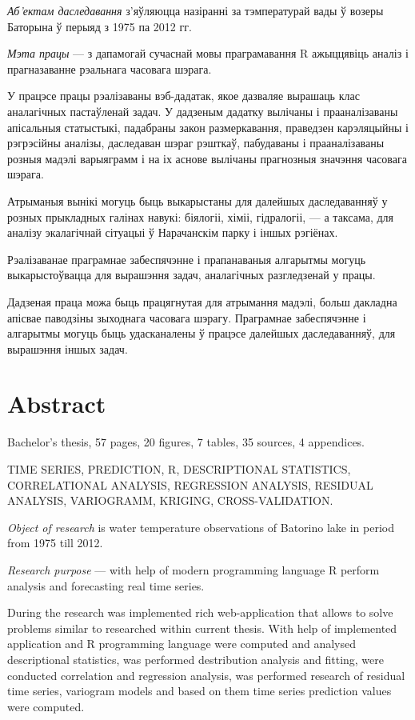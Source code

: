 \textit{Аб'ектам даследавання} з'яўляюцца назіранні за тэмпературай вады ў возеры Баторына ў перыяд з 1975 па 2012 гг.

\textit{Мэта працы} --- з дапамогай сучаснай мовы праграмавання R ажыццявіць аналіз і прагназаванне рэальнага часовага шэрага.

У працэсе працы рэалізаваны вэб-дадатак, якое дазваляе вырашаць клас аналагічных пастаўленай задач. У дадзеным дадатку вылічаны і прааналізаваны апісальныя статыстыкі, падабраны закон размеркавання, праведзен карэляцыйны і рэгрэсійны аналізы, даследаван шэраг рэшткаў, пабудаваны і прааналізаваны розныя мадэлі варыяграмм і на іх аснове вылічаны прагнозныя значэння часовага шэрага.

Атрыманыя вынікі могуць быць выкарыстаны для далейшых даследаванняў у розных прыкладных галінах навукі: біялогіі, хіміі, гідралогіі, --- а таксама, для аналізу экалагічнай сітуацыі ў Нарачанскім парку і іншых рэгіёнах.

Рэалізаванае праграмнае забеспячэнне і прапанаваныя алгарытмы могуць выкарыстоўвацца для вырашэння задач, аналагічных разгледзенай у працы.

Дадзеная праца можа быць працягнутая для атрымання мадэлі, больш дакладна апісвае паводзіны зыходнага часовага шэрагу. Праграмнае забеспячэнне і алгарытмы могуць быць удасканалены ў працэсе далейшых даследаванняў, для вырашэння іншых задач.

\newpage

\chapter*{Abstract}
Bachelor's thesis, 57 pages, 20 figures, 7 tables, 35 sources, 4 appendices.

TIME SERIES, PREDICTION, R, DESCRIPTIONAL STATISTICS, CORRELATIONAL ANALYSIS, REGRESSION ANALYSIS, RESIDUAL ANALYSIS, VARIOGRAMM, KRIGING, CROSS-VALIDATION.

\textit{Object of research} is water temperature observations of Batorino lake in period from 1975 till 2012.

\textit{Research purpose} --- with help of modern programming language R perform analysis and forecasting real time series.

During the research was implemented rich web-application that allows to solve problems similar to researched within current thesis. With help of implemented application and R programming language were computed and analysed descriptional statistics, was performed destribution analysis and fitting, were conducted correlation and regression analysis, was performed research of residual time series, variogram models and based on them time series prediction values were computed.

